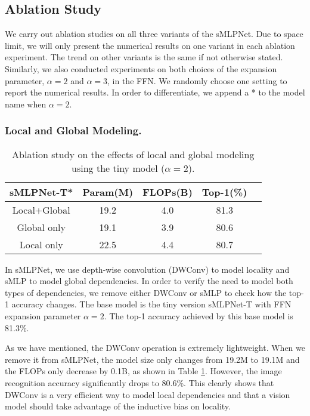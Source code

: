 \documentclass[letterpaper]{article} \usepackage{aaai22}  \usepackage{times}  \usepackage{helvet}  \usepackage{courier}  \usepackage[hyphens]{url}  \usepackage{graphicx} \usepackage{color}
\begin{document}
\subsection{Ablation Study}
We carry out ablation studies on all three variants of the sMLPNet. Due to space limit, we will only present the numerical results on one variant in each ablation experiment. The trend on other variants is the same if not otherwise stated. Similarly, we also conducted experiments on both choices of the expansion parameter, $\alpha=2$ and $\alpha=3$, in the FFN. We randomly choose one setting to report the numerical results. In order to differentiate, we append a * to the model name when $\alpha=2$.


\subsubsection{Local and Global Modeling.}
\begin{table}[t]
\centering
\begin{tabular}{c|c c c c}
    \hline
    sMLPNet-T* & Param(M) & FLOPs(B) & Top-1(\%) \\
    \hline
    Local+Global  &19.2 &4.0 &81.3  \\
    Global only   &19.1 &3.9 &80.6  \\
    Local only    &22.5 &4.4 &80.7  \\
\hline
\end{tabular}
\caption{Ablation study on the effects of local and global modeling using the tiny model ($\alpha=2$).}
\label{tab:local and global}
\end{table}
In sMLPNet, we use depth-wise convolution (DWConv) to model locality and sMLP to model global dependencies. In order to verify the need to model both types of dependencies, we remove either DWConv or sMLP to check how the top-1 accuracy changes. The base model is the tiny version sMLPNet-T with FFN expansion parameter $\alpha=2$. The top-1 accuracy achieved by this base model is 81.3\%. 

As we have mentioned, the DWConv operation is extremely lightweight. When we remove it from sMLPNet, the model size only changes from 19.2M to 19.1M and the FLOPs only decrease by 0.1B, as shown in Table \ref{tab:local and global}. However, the image recognition accuracy significantly drops to 80.6\%. This clearly shows that DWConv is a very efficient way to model local dependencies and that a vision model should take advantage of the inductive bias on locality. 
\end{document}
